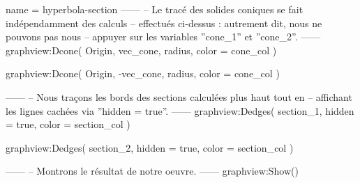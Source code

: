 \documentclass{standalone}
\begin{document}
\begin{luadraw}{name = hyperbola-section}
------
-- Le tracé des solides coniques se fait indépendamment des calculs
-- effectués ci-dessus : autrement dit, nous ne pouvons pas nous
-- appuyer sur les variables ''cone_1'' et ''cone_2''.
------
graphview:Dcone(
  Origin, vec_cone, radius,
  {
    color = cone_col
  }
)

graphview:Dcone(
  Origin, -vec_cone, radius,
  {
    color = cone_col
  }
)

------
-- Nous traçons les bords des sections calculées plus haut tout en
-- affichant les lignes cachées via ''hidden = true''.
------
graphview:Dedges(
  section_1,
  {
    hidden = true,
    color = section_col
  }
)

graphview:Dedges(
  section_2,
  {
    hidden = true,
    color = section_col
  }
)

------
-- Montrons le résultat de notre oeuvre.
------
graphview:Show()
\end{luadraw}
\end{document}
